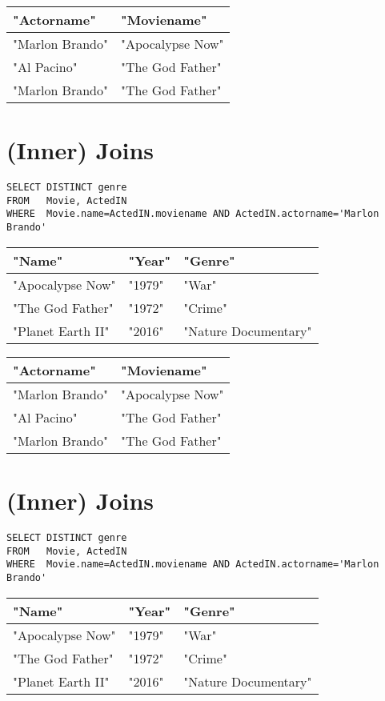 \documentclass{article}
\begin{document}
\begin{tabular}{ll}
\hline
"Actorname" & "Moviename" \\
\hline
"Marlon Brando" & "Apocalypse Now" \\
"Al Pacino" & "The God Father" \\
"Marlon Brando" & "The God Father" \\
\hline
\end{tabular}

\section*{(Inner) Joins}
\begin{verbatim}
SELECT DISTINCT genre
FROM   Movie, ActedIN
WHERE  Movie.name=ActedIN.moviename AND ActedIN.actorname='Marlon Brando'
\end{verbatim}

\begin{tabular}{lll}
\hline
"Name" & "Year" & "Genre" \\
\hline
"Apocalypse Now" & "1979" & "War" \\
"The God Father" & "1972" & "Crime" \\
"Planet Earth II" & "2016" & "Nature Documentary" \\
\hline
\end{tabular}

\begin{tabular}{ll}
\hline
"Actorname" & "Moviename" \\
\hline
"Marlon Brando" & "Apocalypse Now" \\
"Al Pacino" & "The God Father" \\
"Marlon Brando" & "The God Father" \\
\hline
\end{tabular}

\section*{(Inner) Joins}
\begin{verbatim}
SELECT DISTINCT genre
FROM   Movie, ActedIN
WHERE  Movie.name=ActedIN.moviename AND ActedIN.actorname='Marlon Brando'
\end{verbatim}

\begin{tabular}{lll}
\hline
"Name" & "Year" & "Genre" \\
\hline
"Apocalypse Now" & "1979" & "War" \\
"The God Father" & "1972" & "Crime" \\
"Planet Earth II" & "2016" & "Nature Documentary" \\
\hline
\end{tabular}
\end{document}
